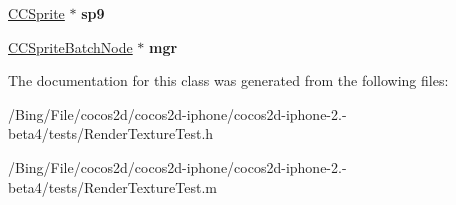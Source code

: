 \begin{DoxyCompactItemize}
\item 
\hypertarget{interface_render_texture_zbuffer_a1f101028fd555cf04b97181df569a7a7}{\hyperlink{class_c_c_sprite}{C\-C\-Sprite} $\ast$ {\bfseries sp9}}\label{interface_render_texture_zbuffer_a1f101028fd555cf04b97181df569a7a7}

\item 
\hypertarget{interface_render_texture_zbuffer_ad2c050b1bfe3c71390e51872523dabc0}{\hyperlink{interface_c_c_sprite_batch_node}{C\-C\-Sprite\-Batch\-Node} $\ast$ {\bfseries mgr}}\label{interface_render_texture_zbuffer_ad2c050b1bfe3c71390e51872523dabc0}

\end{DoxyCompactItemize}


The documentation for this class was generated from the following files\-:\begin{DoxyCompactItemize}
\item 
/\-Bing/\-File/cocos2d/cocos2d-\/iphone/cocos2d-\/iphone-\/2.-\/beta4/tests/Render\-Texture\-Test.\-h\item 
/\-Bing/\-File/cocos2d/cocos2d-\/iphone/cocos2d-\/iphone-\/2.-\/beta4/tests/Render\-Texture\-Test.\-m\end{DoxyCompactItemize}
